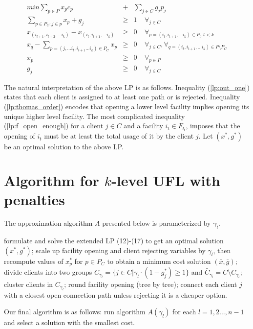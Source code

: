 \documentclass{llncs}
\begin{document}
\begin{eqnarray}
  \label{lp:min}
  min \sum_{p \in P} x_{p}c_{p} &+& \sum_{j \in C} g_j p_j\\
\label{lp:out_one}
  \sum_{p \in P_{C} : j \in p} x_{p} + g_j&\geq& 1 ~~~~~\forall_{j \in C}\\
\label{lp:thomas_order}
  x_{(i_{t+1}, i_{t+2}, \ldots i_{k})} -x_{(i_{t}, i_{t+1}, \ldots i_{k})} &\geq& 0 ~~~~~\forall_{p = (i_{t}, i_{t+1}, \ldots i_{k}) \in P_t, t<k}\\
\label{lp:f_open_enough}
  x_{q} - \sum_{p = (j, \ldots i_{t}, i_{t+1} \ldots i_{k}) \in P_{C}} x_{p} &\geq& 0 ~~~~~\forall_{j \in C}, \forall_{q = (i_{t}, i_{t+1}, \ldots i_{k}) \in P \setminus P_{C}}\\
x_{p} &\geq& 0 ~~~~~\forall_{p \in P} \\
g_{j} &\geq& 0 ~~~~~\forall_{j \in C}
\end{eqnarray}

The natural interpretation of the above LP is as follows.
Inequality (\ref{lp:out_one}) states that each client is assigned to at least one path or is rejected.
Inequality (\ref{lp:thomas_order}) encodes that opening a lower level facility implies opening its unique higher level facility.
The most complicated inequality (\ref{lp:f_open_enough}) for a client $j \in C$ and a facility $i_{t} \in F_{l_t}$,
imposes that the opening of $i_t$ must be at least the total usage of it by the client $j$. Let $(x^*, g^*)$ be an optimal solution to the above LP.

\section{Algorithm for $k$-level UFL with penalties}

The approximation algorithm $A$ presented below is parameterized by $\gamma_l$.
\begin{algorithmic}[1]
 \STATE formulate and solve the extended LP (12)-(17) to get an optimal solution  $(x^*, g^*)$;
 \STATE scale up facility opening and client rejecting variables by $\gamma_l$,
 then recompute values of $x^*_{p}$ for $p \in P_C$ to obtain a minimum cost solution $(\bar{x}, \bar{g});$\\
 \STATE divide clients into two groups $C_{\gamma_l} = \{ j \in C | \gamma_l \cdot (1 - g_j^*) \geq 1 \}$ and $\bar{C}_{\gamma_l} = C \setminus C_{\gamma_l};$
 \STATE cluster clients in $C_{\gamma_l}$;
 \STATE round facility opening (tree by tree);
 \STATE connect each client $j$ with a closest open connection path unless rejecting it is a cheaper option.
\end{algorithmic}
Our final algorithm is as follows: run algorithm $A(\gamma_l)$ for each $l = 1, 2 \dots, n-1$ and select a solution with the smallest cost.
\end{document}
